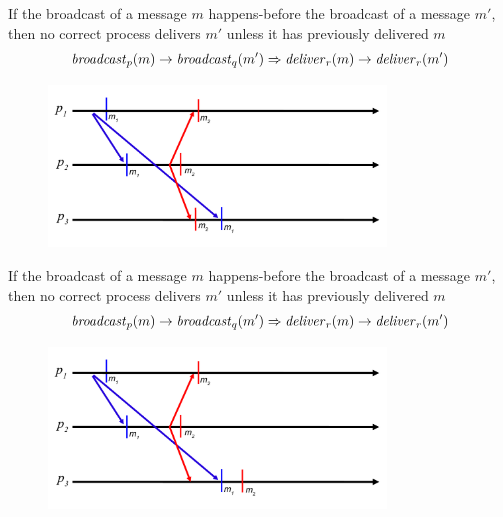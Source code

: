 \begin{frame}

\begin{definition}
If the broadcast of a message $m$ \alert{happens-before} the broadcast of a message $m'$, then 
no correct process delivers $m'$ unless it has previously delivered $m$
\[
  \mathit{broadcast}_p(m) \rightarrow \mathit{broadcast}_q(m') \Rightarrow \mathit{deliver}_r(m) \rightarrow \mathit{deliver}_r(m')
\]
\end{definition}

 

\begin{figure}
\includegraphics[width=0.8\textwidth]{figs/04/rb-causal2}
\end{figure}
		
\end{frame}

\begin{frame}

\begin{definition}
If the broadcast of a message $m$ \alert{happens-before} the broadcast of a message $m'$, then 
no correct process delivers $m'$ unless it has previously delivered $m$
\[
  \mathit{broadcast}_p(m) \rightarrow \mathit{broadcast}_q(m') \Rightarrow \mathit{deliver}_r(m) \rightarrow \mathit{deliver}_r(m')
\]
\end{definition}

 

\begin{figure}
\includegraphics[width=0.8\textwidth]{figs/04/rb-causal3}
\end{figure}
		
\end{frame}

